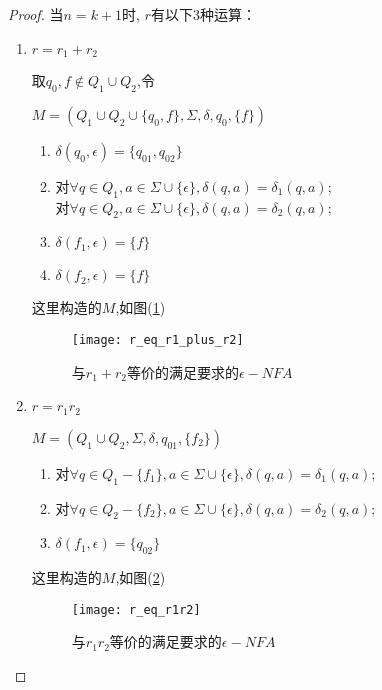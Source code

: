 \begin{proof}
    \hfill
    
    当$n=k+1$时, $r$有以下3种运算：
    
    \begin{enumerate}
    	\item $r=r_1+r_2$
	    
	    取$q_0,f\notin Q_1\cup Q_2$,令
	    
	    $M=(Q_1\cup Q_2\cup \{q_0,f\},\Sigma,\delta,q_{0},\{f\})$
	    
	    \begin{enumerate}
	    	\item $\delta(q_0,\epsilon)=\{q_{01},q_{02}\}$
	    	\item 对$\forall q\in Q_1,a\in\Sigma\cup\{\epsilon\},\delta(q,a)=\delta_1(q,a)$;\\
	    	对$\forall q\in Q_2,a\in\Sigma\cup\{\epsilon\},\delta(q,a)=\delta_2(q,a)$;
	    	\item $\delta(f_1,\epsilon)=\{f\}$
	    	\item $\delta(f_2,\epsilon)=\{f\}$
	    \end{enumerate}
	    
	    这里构造的$M$,如图(\ref{fig:r_eq_r1_plus_r2})
	    \begin{figure}[htbp]
	    	\texttt{[image: r\_eq\_r1\_plus\_r2]}
	    	\caption{与$r_1+r_2$等价的满足要求的$\epsilon -NFA$}
	    	\label{fig:r_eq_r1_plus_r2}       %
	    \end{figure}
    
        \item $r=r_1r_2$
        
         $M=(Q_1\cup Q_2,\Sigma,\delta,q_{01},\{f_2\})$
        
        \begin{enumerate}
        	\item 对$\forall q\in Q_1-\{f_1\},a\in\Sigma\cup\{\epsilon\},\delta(q,a)=\delta_1(q,a)$;
        	\item 对$\forall q\in Q_2-\{f_2\},a\in\Sigma\cup\{\epsilon\},\delta(q,a)=\delta_2(q,a)$;
        	\item $\delta(f_1,\epsilon)=\{q_{02}\}$
        \end{enumerate}
        
        这里构造的$M$,如图(\ref{fig:r_eq_r1r2})
        \begin{figure}[htbp]
        	\texttt{[image: r\_eq\_r1r2]}
        	\caption{与$r_1r_2$等价的满足要求的$\epsilon -NFA$}
        	\label{fig:r_eq_r1r2}       %
        \end{figure}
    

\end{enumerate}
\end{proof}
